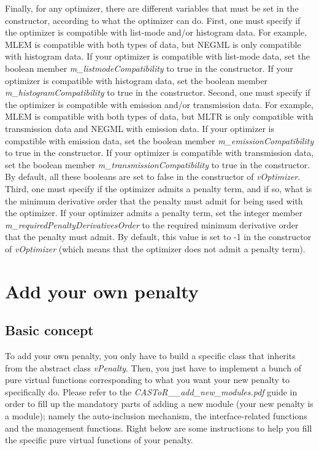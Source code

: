 \documentclass[a4paper, 11pt]{article}
\begin{document}
Finally, for any optimizer, there are different variables that must be set in the constructor, according to what the optimizer can do.
First, one must specify if the optimizer is compatible with list-mode and/or histogram data.
For example, MLEM is compatible with both types of data, but NEGML is only compatible with histogram data.
If your optimizer is compatible with list-mode data, set the boolean member \textit{m\_listmodeCompatibility} to true in the constructor.
If your optimizer is compatible with histogram data, set the boolean member \textit{m\_histogramCompatibility} to true in the constructor.
Second, one must specify if the optimizer is compatible with emission and/or transmission data.
For example, MLEM is compatible with both types of data, but MLTR is only compatible with transmission data and NEGML with emission data.
If your optimizer is compatible with emission data, set the boolean member \textit{m\_emissionCompatibility} to true in the constructor.
If your optimizer is compatible with transmission data, set the boolean member \textit{m\_transmissionCompatibility} to true in the constructor.
By default, all these booleans are set to false in the constructor of \textit{vOptimizer}.
Third, one must specify if the optimizer admits a penalty term, and if so, what is the minimum derivative order that the penalty must admit for being used with the optimizer.
If your optimizer admits a penalty term, set the integer member \textit{m\_requiredPenaltyDerivativesOrder} to the required minimum derivative order that the penalty must admit.
By default, this value is set to -1 in the constructor of \textit{vOptimizer} (which means that the optimizer does not admit a penalty term).

\section{Add your own penalty}

\subsection{Basic concept}

To add your own penalty, you only have to build a specific class that inherits from the abstract class \textit{vPenalty}.
Then, you just have to implement a bunch of pure virtual functions corresponding to what you want your new penalty to specifically do.
Please refer to the \textit{CASToR\_\_add\_new\_modules.pdf} guide in order to fill up the mandatory parts of adding a new module (your new penalty is a module);
namely the auto-inclusion mechanism, the interface-related functions and the management functions.
Right below are some instructions to help you fill the specific pure virtual functions of your penalty.\\
\end{document}
